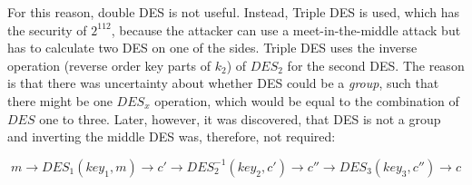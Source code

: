 For this reason, double DES is not useful. Instead, Triple DES is used, which has the security of $2^{112}$, because the attacker can use a meet-in-the-middle attack but has to calculate two DES on one of the sides. Triple DES uses the inverse operation (reverse order key parts of $k_2$) of $DES_2$ for the second DES. The reason is that there was uncertainty about whether DES could be a \textit{group}, such that there might be one $DES_{x}$ operation, which would be equal to the combination of $DES$ one to three. Later, however, it was discovered, that DES is not a group and inverting the middle DES was, therefore, not required:

$$
m \rightarrow DES_{1}(key_1, m) \rightarrow c' \rightarrow DES^{-1}_{2}(key_2, c') \rightarrow c'' \rightarrow DES_{3}(key_3, c'') \rightarrow c
$$